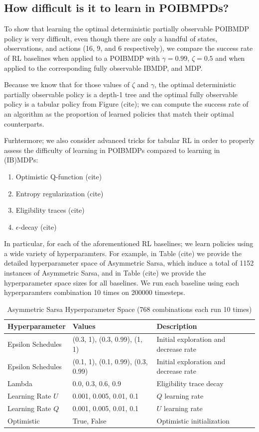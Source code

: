 \subsection{How difficult is it to learn in POIBMPDs?}

To show that learning the optimal deterministic partially observable POIBMDP policy is very difficult, even though there are only a handful of states, observations, and actions (16, 9, and 6 respectively), we compare the success rate of RL baselines when applied to a POIBMDP with $\gamma=0.99$, $\zeta=0.5$ and when applied to the corresponding fully observable IBMDP, and MDP.

Because we know that for those values of $\zeta$ and $\gamma$, the optimal deterministic partially observable policy is a depth-1 tree and the optimal fully observable policy is a tabular policy from Figure (cite); we can compute the success rate of an algorithm as the proportion of learned policies that match their optimal counterparts.

Furhtermore; we also consider advanced tricks for tabular RL in order to properly assess the difficulty of learning in POIBMDPs compared to learning in (IB)MDPs:
\begin{enumerate}
    \item Optimistic Q-function (cite)
    \item Entropy regularization (cite)
    \item Eligibility traces (cite)
    \item $\epsilon$-decay (cite)
\end{enumerate}
In particular, for each of the aforementioned RL baselines; we learn policies using a wide variety of hyperparamters.
For example, in Table (cite) we provide the detailed hyperparameter space of Asymmetric Sarsa, which induce a total of 1152 instances of Asymmetric Sarsa, and in Table (cite) we provide the hyperparameter space sizes for all baselines.
We run each baseline using each hyperparamters combination 10 times on 200000 timesteps.

\begin{table}[h]
\centering
\caption{Asymmetric Sarsa Hyperparameter Space (768 combinations each run 10 times)}
\begin{tabular}{lll}
\toprule
\textbf{Hyperparameter} & \textbf{Values} & \textbf{Description} \\
\midrule
Epsilon Schedules & (0.3, 1), (0.3, 0.99), (1, 1) & Initial exploration and decrease rate \\
Epsilon Schedules & (0.1, 1), (0.1, 0.99), (0.3, 0.99) & Initial exploration and decrease rate \\
Lambda & 0.0, 0.3, 0.6, 0.9 & Eligibility trace decay \\
Learning Rate $U$ & 0.001, 0.005, 0.01, 0.1 & $Q$ learning rate \\
Learning Rate $Q$ & 0.001, 0.005, 0.01, 0.1 & $U$ learning rate \\
Optimistic & True, False & Optimistic initialization \\
\bottomrule
\end{tabular}
\end{table}

